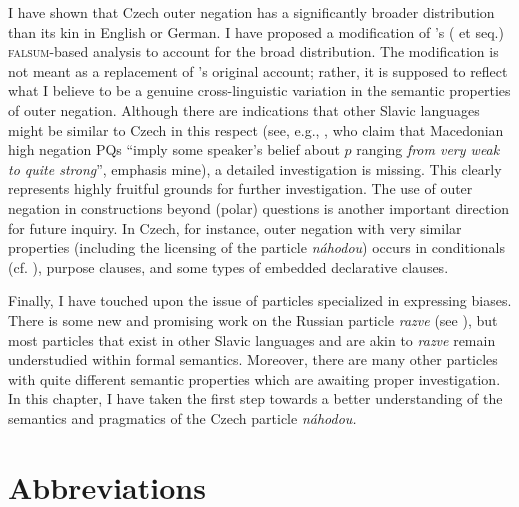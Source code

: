 \documentclass[output=paper,colorlinks,citecolor=brown]{langscibook}
\begin{document}
I have shown that Czech outer negation has a significantly broader distribution than its kin in English or German. I have proposed a modification of \citeauthor{Repp2006}'s (\citeyear{Repp2006} et seq.) \textsc{falsum}-based analysis to account for the broad distribution. The modification is not meant as a replacement of \citeauthor{Repp2006}'s original account; rather, it is supposed to reflect what I believe to be a genuine cross-linguistic variation in the semantic properties of outer negation. Although there are indications that other Slavic languages might be similar to Czech in this respect (see, e.g., \citealt[147]{Mitkovska.Buzarovska2024}, who claim that Macedonian high negation PQs ``imply some speaker's belief about $p$ ranging \textit{from very weak to quite strong}'', emphasis mine), a detailed investigation is missing. This clearly represents highly fruitful grounds for further investigation. The use of outer negation in constructions beyond (polar) questions is another important direction for future inquiry. In Czech, for instance, outer negation with very similar properties (including the licensing of the particle \textit{náhodou}) occurs in conditionals (cf. \citealt{Romero2015}), purpose clauses, and some types of embedded declarative clauses.

Finally, I have touched upon the issue of particles specialized in expressing biases. There is some new and promising work on the Russian particle \textit{razve} (see \citealt{Korotkova2023,Repp.Geist2025}), but most particles that exist in other Slavic languages and are akin to \textit{razve} remain understudied within formal semantics. Moreover, there are many other particles with quite different semantic properties which are awaiting proper investigation. In this chapter, I have taken the first step towards a better understanding of the semantics and pragmatics of the Czech particle \textit{náhodou.}

\section*{Abbreviations}
\end{document}
